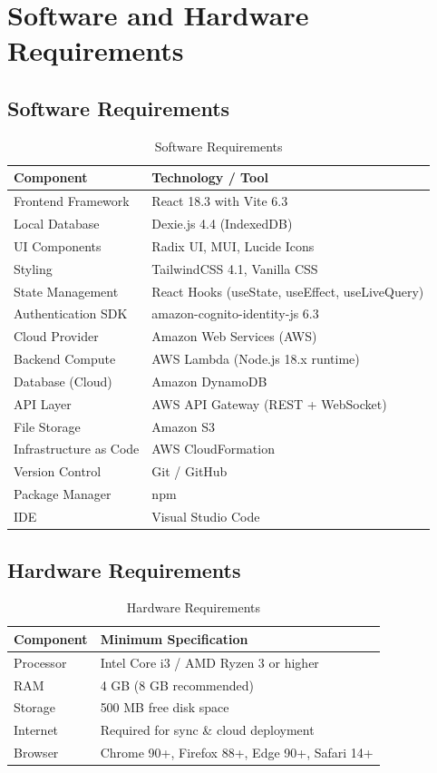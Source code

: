 \documentclass[12pt, a4paper, oneside]{report}
\begin{document}
\section{Software and Hardware Requirements}

\subsection{Software Requirements}
\begin{table}[H]
\centering
\caption{Software Requirements}
\label{tab:software-req}
\begin{tabular}{|l|l|}
\hline
\textbf{Component} & \textbf{Technology / Tool} \\
\hline
Frontend Framework & React 18.3 with Vite 6.3 \\
\hline
Local Database & Dexie.js 4.4 (IndexedDB) \\
\hline
UI Components & Radix UI, MUI, Lucide Icons \\
\hline
Styling & TailwindCSS 4.1, Vanilla CSS \\
\hline
State Management & React Hooks (useState, useEffect, useLiveQuery) \\
\hline
Authentication SDK & amazon-cognito-identity-js 6.3 \\
\hline
Cloud Provider & Amazon Web Services (AWS) \\
\hline
Backend Compute & AWS Lambda (Node.js 18.x runtime) \\
\hline
Database (Cloud) & Amazon DynamoDB \\
\hline
API Layer & AWS API Gateway (REST + WebSocket) \\
\hline
File Storage & Amazon S3 \\
\hline
Infrastructure as Code & AWS CloudFormation \\
\hline
Version Control & Git / GitHub \\
\hline
Package Manager & npm \\
\hline
IDE & Visual Studio Code \\
\hline
\end{tabular}
\end{table}

\subsection{Hardware Requirements}
\begin{table}[H]
\centering
\caption{Hardware Requirements}
\label{tab:hardware-req}
\begin{tabular}{|l|l|}
\hline
\textbf{Component} & \textbf{Minimum Specification} \\
\hline
Processor & Intel Core i3 / AMD Ryzen 3 or higher \\
\hline
RAM & 4 GB (8 GB recommended) \\
\hline
Storage & 500 MB free disk space \\
\hline
Internet & Required for sync \& cloud deployment \\
\hline
Browser & Chrome 90+, Firefox 88+, Edge 90+, Safari 14+ \\
\hline
\end{tabular}
\end{table}
\end{document}
